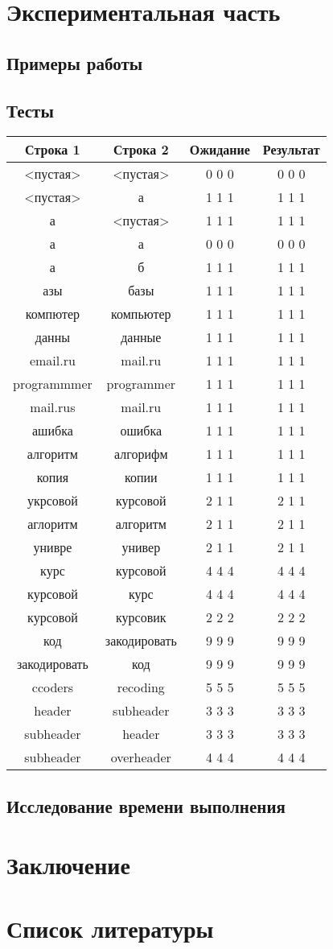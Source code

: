 ﻿\documentclass[12pt]{report}
\begin{document}
	\chapter{Экспериментальная часть}
	\section{Примеры работы}
	\section{Тесты}
	\begin{tabular}{|c|c|c|c|}
	\hline
	Строка 1 & Строка 2 & Ожидание & Результат\\\hline
	<пустая> & <пустая> & 0 0 0 & 0 0 0\\\hline
	<пустая> & а & 1 1 1 & 1 1 1\\\hline
	а & <пустая> & 1 1 1 & 1 1 1\\\hline
	а & а & 0 0 0 & 0 0 0\\\hline
	а & б & 1 1 1 & 1 1 1\\\hline
	азы & базы & 1 1 1 & 1 1 1\\\hline
	компютер & компьютер & 1 1 1 & 1 1 1\\\hline
	данны & данные & 1 1 1 & 1 1 1\\\hline
	email.ru & mail.ru & 1 1 1 & 1 1 1\\\hline
	programmmer & programmer & 1 1 1 & 1 1 1\\\hline
	mail.rus & mail.ru & 1 1 1 & 1 1 1\\\hline
	ашибка & ошибка & 1 1 1 & 1 1 1\\\hline
	алгоритм & алгорифм & 1 1 1 & 1 1 1\\\hline
	копия & копии & 1 1 1 & 1 1 1\\\hline
	укрсовой & курсовой & 2 1 1 & 2 1 1\\\hline
	аглоритм & алгоритм & 2 1 1 & 2 1 1\\\hline
	унивре & универ & 2 1 1 & 2 1 1\\\hline
	курс & курсовой & 4 4 4 & 4 4 4\\\hline
	курсовой & курс & 4 4 4 & 4 4 4\\\hline
	курсовой & курсовик & 2 2 2 & 2 2 2\\\hline
	код & закодировать & 9 9 9 & 9 9 9\\\hline
	закодировать & код & 9 9 9 & 9 9 9\\\hline
	ccoders & recoding & 5 5 5 & 5 5 5\\\hline
	header & subheader & 3 3 3 & 3 3 3\\\hline
	subheader & header & 3 3 3 & 3 3 3\\\hline
	subheader & overheader & 4 4 4 & 4 4 4\\\hline
	\end{tabular}
   \section{Исследование времени выполнения}

   \chapter*{Заключение}

	\chapter*{Список литературы}
\end{document}
